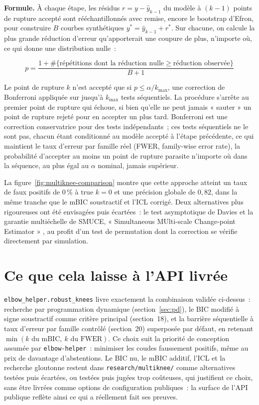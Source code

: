 \documentclass[11pt]{article}
\newcommand{\code}[1]{\texttt{#1}}
\begin{document}
\textbf{Formule.} À chaque étape, les résidus $r = y - \hat y_{k-1}$ du
modèle à $(k-1)$ points de rupture accepté sont rééchantillonnés avec
remise, encore le bootstrap d'Efron, pour construire $B$ courbes
synthétiques $y^\ast = \hat y_{k-1} + r^\ast$. Sur chacune, on calcule la
plus grande réduction d'erreur qu'apporterait une coupure de plus,
n'importe où, ce qui donne une distribution nulle~:

\begin{equation}
p = \frac{1 + \#\{\text{répétitions dont la réduction nulle} \ge \text{réduction observée}\}}{B + 1}
\end{equation}

Le point de rupture $k$ n'est accepté que si $p \le \alpha / k_{\max}$, une
correction de Bonferroni appliquée sur jusqu'à $k_{\max}$ tests
séquentiels. La procédure s'arrête au premier point de rupture qui échoue,
si bien qu'elle ne peut jamais « sauter » un point de rupture rejeté pour
en accepter un plus tard. Bonferroni est une correction conservatrice pour
des tests indépendants~; ces tests séquentiels ne le sont pas, chacun étant
conditionné au modèle accepté à l'étape précédente, ce qui maintient le
taux d'erreur par famille réel (FWER, family-wise error rate), la
probabilité d'accepter au moins un point de rupture parasite n'importe où
dans la séquence, au plus égal au $\alpha$ nominal, jamais supérieur.

La figure~\ref{fig:multiknee-comparison} montre que cette approche
atteint un taux de faux positifs de $0\,\%$ à $\text{true } k = 0$ et
une précision globale de $0{,}82$, dans la même tranche que le mBIC
soustractif et l'ICL corrigé. Deux
alternatives plus rigoureuses ont été envisagées puis écartées~: le test
asymptotique de Davies \citeyearpar{davies1977} et la garantie multiéchelle
de SMUCE, « Simultaneous MUlti-scale Change-point Estimator »
\citep{frick2014}, au profit d'un test de permutation dont la correction se
vérifie directement par simulation.

\section{Ce que cela laisse à l'API livrée}

\code{elbow\_helper.robust\_knees} livre exactement la combinaison validée
ci-dessus~: recherche par programmation dynamique (section~\ref{sec:pd}),
le BIC modifié à signe soustractif comme critère principal (section~18), et
la barrière séquentielle à taux d'erreur par famille contrôlé (section~20)
superposée par défaut, en retenant $\min(k \text{ du mBIC},\ k \text{ du
FWER})$. Ce choix suit la priorité de conception assumée par
\code{elbow-helper}~: minimiser les coudes faussement positifs, même au
prix de davantage d'abstentions. Le BIC nu, le mBIC additif, l'ICL et la
recherche gloutonne restent dans \code{research/multiknee/} comme
alternatives testées puis écartées, ou testées puis jugées trop coûteuses,
qui justifient ce choix, sans être livrées comme options de configuration
publiques~: la surface de l'API publique reflète ainsi ce qui a réellement
fait ses preuves.
\end{document}
